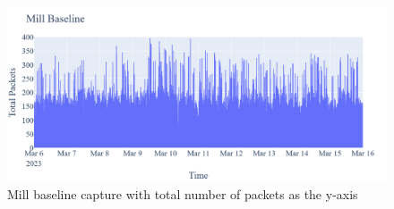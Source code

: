 \begin{figure} [H]
    \centering
    \includegraphics[scale=0.25]{figures/Mill_Baseline_TotalPackets.png}
    \caption{Mill baseline capture with total number of packets as the y-axis}
    \label{fig:MillBaselineTotalPackets}
 \end{figure}

